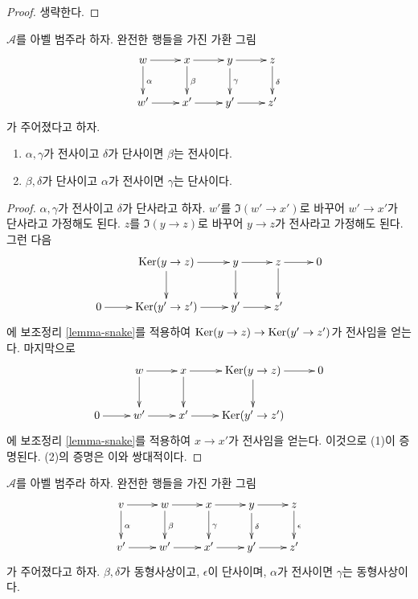 \begin{proof}
생략한다.
\end{proof}

\begin{lemma}
\label{lemma-four-lemma}
$\mathcal{A}$를 아벨 범주라 하자. 완전한 행들을 가진 가환 그림
$$
\xymatrix{
w \ar[r] \ar[d]^\alpha & x \ar[r] \ar[d]^\beta & y \ar[r] \ar[d]^\gamma &
z \ar[d]^\delta \\
w' \ar[r] & x' \ar[r] & y' \ar[r] & z'
}
$$
가 주어졌다고 하자.
\begin{enumerate}
\item $\alpha, \gamma$가 전사이고 $\delta$가 단사이면 $\beta$는 전사이다.
\item $\beta, \delta$가 단사이고 $\alpha$가 전사이면 $\gamma$는 단사이다.
\end{enumerate}
\end{lemma}

\begin{proof}
$\alpha, \gamma$가 전사이고 $\delta$가 단사라고 하자.
$w'$를 $\Im(w' \to x')$로 바꾸어 $w' \to x'$가 단사라고 가정해도 된다.
$z$를 $\Im(y \to z)$로 바꾸어 $y \to z$가 전사라고 가정해도 된다.
그런 다음
$$
\xymatrix{
& \Ker(y \to z) \ar[r] \ar[d] & y \ar[r] \ar[d] & z \ar[r] \ar[d] & 0 \\
0 \ar[r] & \Ker(y' \to z') \ar[r] & y' \ar[r] & z'
}
$$
에 보조정리 \ref{lemma-snake}를 적용하여
$\mathop{\mathrm{Ker}}(y \to z) \to \mathop{\mathrm{Ker}}(y' \to z')$가 전사임을 얻는다.
마지막으로
$$
\xymatrix{
& w \ar[r] \ar[d] & x \ar[r] \ar[d] & \Ker(y \to z) \ar[r] \ar[d] & 0 \\
0 \ar[r] & w' \ar[r] & x' \ar[r] & \Ker(y' \to z')
}
$$
에 보조정리 \ref{lemma-snake}를 적용하여 $x \to x'$가 전사임을 얻는다.
이것으로 (1)이 증명된다. (2)의 증명은 이와 쌍대적이다.
\end{proof}

\begin{lemma}
\label{lemma-five-lemma}
\begin{reference}
\cite[Lemma 4.5 page 16]{Eilenberg-Steenrod}
\end{reference}
$\mathcal{A}$를 아벨 범주라 하자. 완전한 행들을 가진 가환 그림
$$
\xymatrix{
v \ar[r] \ar[d]^\alpha &
w \ar[r] \ar[d]^\beta &
x \ar[r] \ar[d]^\gamma &
y \ar[r] \ar[d]^\delta &
z \ar[d]^\epsilon \\
v' \ar[r] & w' \ar[r] & x' \ar[r] & y' \ar[r] & z'
}
$$
가 주어졌다고 하자. $\beta, \delta$가 동형사상이고,
$\epsilon$이 단사이며, $\alpha$가 전사이면 $\gamma$는 동형사상이다.
\end{lemma}

